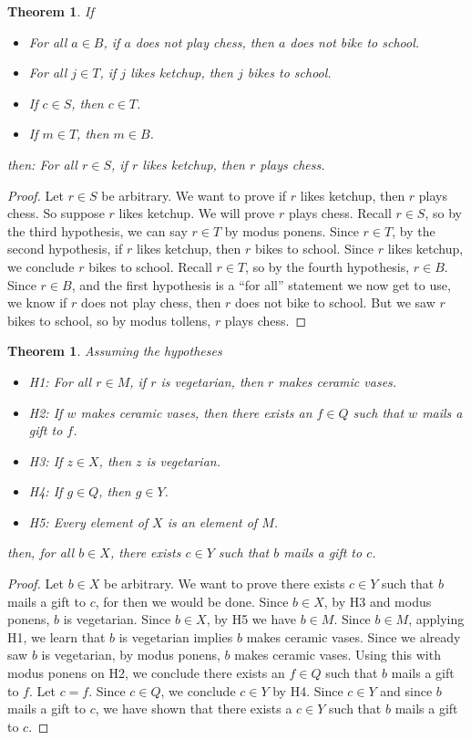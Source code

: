 \documentclass{book}
\newcounter{ekcounter}%
\theoremstyle{ekimcustom}
\newtheorem{theorem}[ekcounter]{Theorem}
\begin{document}
\begin{theorem}\label{theorem:universal-first-decontextualized-training}
If
\begin{itemize}
\item For all $a \in B$, if $a$ does not play chess, then $a$ does not bike to school.
\item For all $j \in T$, if $j$ likes ketchup, then $j$ bikes to school.
\item If $c \in S$, then $c \in T$.
\item If $m \in T$, then $m \in B$.
\end{itemize}
then: For all $r \in S$, if $r$ likes ketchup, then $r$ plays chess.
\end{theorem}
\begin{proof}
Let $r \in S$ be arbitrary. We want to prove if $r$ likes ketchup, then $r$ plays chess. So suppose $r$ likes ketchup. We will prove $r$ plays chess. Recall $r \in S$, so by the third hypothesis, we can say $r \in T$ by modus ponens. Since $r \in T$, by the second hypothesis, if $r$ likes ketchup, then $r$ bikes to school. Since $r$ likes ketchup, we conclude $r$ bikes to school. Recall $r \in T$, so by the fourth hypothesis, $r \in B$. Since $r \in B$, and the first hypothesis is a ``for all'' statement we now get to use, we know if $r$ does not play chess, then $r$ does not bike to school. But we saw $r$ bikes to school, so by modus tollens, $r$ plays chess.
\end{proof}

\begin{theorem}
Assuming the hypotheses
\begin{itemize}
\item H1: For all $r \in M$, if $r$ is vegetarian, then $r$ makes ceramic vases.
\item H2: If $w$ makes ceramic vases, then there exists an $f \in Q$ such that $w$ mails a gift to $f$.
\item H3: If $z \in X$, then $z$ is vegetarian.
\item H4: If $g \in Q$, then $g \in Y$.
\item H5: Every element of $X$ is an element of $M$.
\end{itemize}
then, for all $b \in X$, there exists $c \in Y$ such that $b$ mails a gift to $c$.
\end{theorem}
\begin{proof}
Let $b \in X$ be arbitrary. We want to prove there exists $c \in Y$ such that $b$ mails a gift to $c$, for then we would be done. Since $b \in X$, by H3 and modus ponens, $b$ is vegetarian. Since $b \in X$, by H5 we have $b \in M$. Since $b \in M$, applying H1, we learn that $b$ is vegetarian implies $b$ makes ceramic vases. Since we already saw $b$ is vegetarian, by modus ponens, $b$ makes ceramic  vases. Using this with modus ponens on H2, we conclude there exists an $f \in Q$ such that $b$ mails a gift to $f$. Let $c = f$. Since $c \in Q$, we conclude $c \in Y$ by H4. Since $c \in Y$ and since $b$ mails a gift to $c$, we have shown that there exists a $c \in Y$ such that $b$ mails a gift to $c$.
\end{proof}
\end{document}
